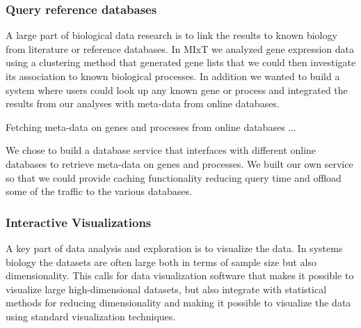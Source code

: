 


\subsubsection*{Query reference databases} 
A large part of biological data research is to link the results to known biology
from literature or reference databases. In MIxT we analyzed gene expression
data using a clustering method that generated gene lists that we could then
investigate its association to known biological processes. In addition we wanted
to build a system where users could look up any known gene or process and
integrated the results from our analyses with meta-data from online databases.

Fetching meta-data on genes and processes from online databases  ... 

We chose to build a database service that interfaces with different online
databases to retrieve meta-data on genes and processes. We built our own service
so that we could provide caching functionality reducing query time and
offload some of the traffic to the various databases. 



\subsubsection*{Interactive Visualizations}  
A key part of data analysis and exploration is to visualize the data. In systems
biology the datasets are often large both in terms of sample size but also
dimensionality. This calls for data visualization software that makes it
possible to visualize large high-dimensional datasets, but also
integrate with statistical methods for reducing dimensionality and making it
possible to visualize the data using standard visualization techniques. 

